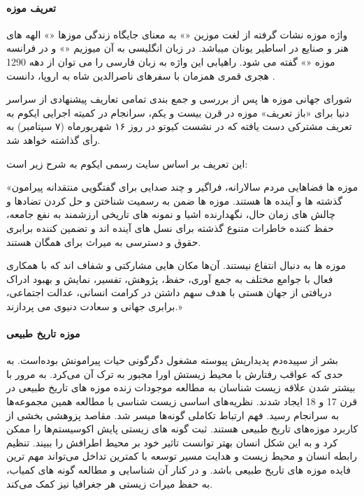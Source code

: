

\paragraph*{تعریف موزه}

واژه موزه نشات گرفته از لغت موزین «» به معنای جایگاه زندگی موزها «» الهه های هنر و صنایع در اساطیر یونان میباشد. در زبان انگلیسی به آن میوزیم «» و در فرانسه موزه «» گفته می شود. راهیابی این واژه به زبان فارسی را می توان از دهه 1290 هجری قمری همزمان با سفرهای ناصرالدین شاه به اروپا، دانست .

شورای جهانی موزه ها پس از بررسی و جمع بندی تمامی تعاریف پیشنهادی از سراسر دنیا برای «باز تعریف» موزه در قرن بیست و یکم، سرانجام در کمیته اجرایی ایکوم به تعریف مشترکی دست یافته که در نشست کیوتو در روز ۱۶ شهریورماه (۷ سپتامبر) به رأی گذاشته خواهد شد.

این تعریف بر اساس سایت رسمی ایکوم به شرح زیر است:

«موزه ها فضاهایی مردم سالارانه، فراگیر و چند صدایی برای گفتگویی منتقدانه پیرامون گذشته ها و آینده ها هستند. موزه ها ضمن به رسمیت شناختن و حل کردن تضادها و چالش های زمان حال، نگهدارنده اشیا و نمونه های تاریخی ارزشمند به نفع جامعه، حفظ کننده خاطرات متنوع گذشته برای نسل های آینده اند و تضمین کننده برابری حقوق و دسترسی به میراث برای همگان هستند.

موزه ها به دنبال انتفاع نیستند. آن‌ها مکان هایی مشارکتی و شفاف اند که با همکاری فعال با جوامع مختلف به جمع آوری، حفظ، پژوهش، تفسیر، نمایش و بهبود ادراک دریافتی از جهان هستی با هدف سهم داشتن در کرامت انسانی، عدالت اجتماعی، برابری جهانی و سعادت دنیوی می پردازند.»

\paragraph*{موزه تاریخ طبیعی}

بشر از سپیده‌دم پدیداریش پیوسته مشغول دگرگونی حیات پیرامونش بوده‌است. به حدی که عواقب رفتارش با محیط زیستش اورا مجبور به ترک آن می‌کرد. به مرور با بیشتر شدن علاقه زیست شناسان به مطالعه موجودات زنده موزه های تاریخ طبیعی در قرن 17 و 18 ایجاد شدند. 
نظریه‌های اساسی زیست شناسی با مطالعه همین مجموعه‌ها به سرانجام رسید. فهم ارتباط تکاملی گونه‌ها میسر شد. مقاصد پزوهشی بخشی از کاربرد موزه‌های تاریخ طبیعی هستند. ثبت گونه های زیستی پایش اکوسیستم‌ها را ممکن کرد و به این شکل انسان بهتر توانست تاثیر خود بر محیط اطرافش  را ببیند. تنظیم رابطه انسان و محیط زیست و هدایت مسیر توسعه با کمترین تداخل می‌تواند مهم ترین فایده موزه های تاریخ طبیعی باشد. و در کنار آن شناسایی و مطالعه گونه های کمیاب، به حفظ میراث زیستی هر جغرافیا نیز کمک می‌کند.


